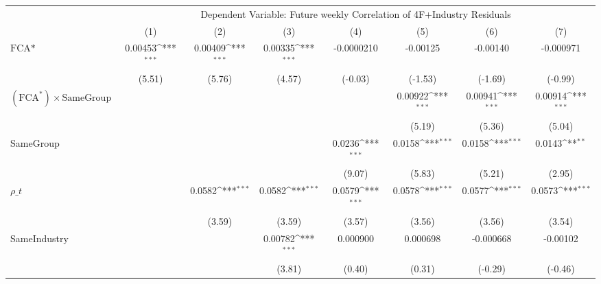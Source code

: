 {
\def\sym#1{\ifmmode^{#1}\else\(^{#1}\)\fi}
\begin{tabular}{l*{7}{c}}
\hline\hline
                &\multicolumn{7}{c}{Dependent Variable: Future weekly Correlation of 4F+Industry Residuals}                                          \\\cmidrule(lr){2-8}
                &\multicolumn{1}{c}{(1)}         &\multicolumn{1}{c}{(2)}         &\multicolumn{1}{c}{(3)}         &\multicolumn{1}{c}{(4)}         &\multicolumn{1}{c}{(5)}         &\multicolumn{1}{c}{(6)}         &\multicolumn{1}{c}{(7)}         \\
\hline
$ \text{FCA*} $ &  0.00453\sym{***}&  0.00409\sym{***}&  0.00335\sym{***}&-0.0000210         & -0.00125         & -0.00140         &-0.000971         \\
                &   (5.51)         &   (5.76)         &   (4.57)         &  (-0.03)         &  (-1.53)         &  (-1.69)         &  (-0.99)         \\
[1em]
 $ (\text{FCA}^*) \times {\text{SameGroup} }  $ &                  &                  &                  &                  &  0.00922\sym{***}&  0.00941\sym{***}&  0.00914\sym{***}\\
                &                  &                  &                  &                  &   (5.19)         &   (5.36)         &   (5.04)         \\
[1em]
SameGroup       &                  &                  &                  &   0.0236\sym{***}&   0.0158\sym{***}&   0.0158\sym{***}&   0.0143\sym{**} \\
                &                  &                  &                  &   (9.07)         &   (5.83)         &   (5.21)         &   (2.95)         \\
[1em]
 $ {\rho\_t} $   &                  &   0.0582\sym{***}&   0.0582\sym{***}&   0.0579\sym{***}&   0.0578\sym{***}&   0.0577\sym{***}&   0.0573\sym{***}\\
                &                  &   (3.59)         &   (3.59)         &   (3.57)         &   (3.56)         &   (3.56)         &   (3.54)         \\
[1em]
SameIndustry    &                  &                  &  0.00782\sym{***}& 0.000900         & 0.000698         &-0.000668         & -0.00102         \\
                &                  &                  &   (3.81)         &   (0.40)         &   (0.31)         &  (-0.29)         &  (-0.46)         \\

\end{tabular}}
